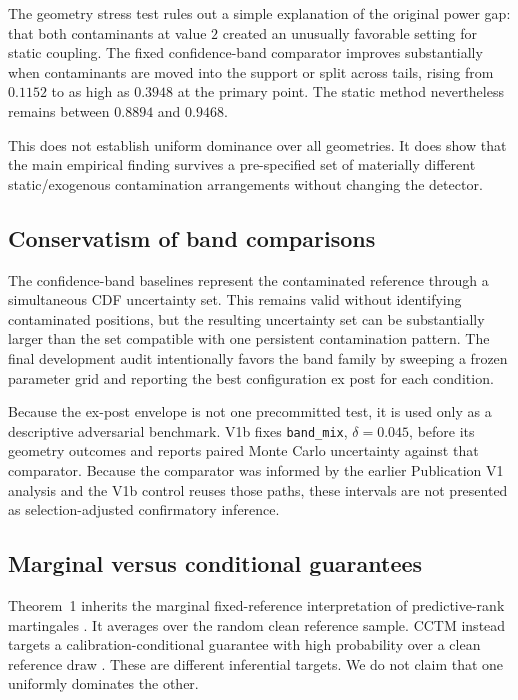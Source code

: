 The geometry stress test rules out a simple explanation of the original power gap: that both contaminants at value \(2\) created an unusually favorable setting for static coupling. The fixed confidence-band comparator improves substantially when contaminants are moved into the support or split across tails, rising from \(0.1152\) to as high as \(0.3948\) at the primary point. The static method nevertheless remains between \(0.8894\) and \(0.9468\).

This does not establish uniform dominance over all geometries. It does show that the main empirical finding survives a pre-specified set of materially different static/exogenous contamination arrangements without changing the detector.

\subsection{Conservatism of band comparisons}

The confidence-band baselines represent the contaminated reference through a simultaneous CDF uncertainty set. This remains valid without identifying contaminated positions, but the resulting uncertainty set can be substantially larger than the set compatible with one persistent contamination pattern. The final development audit intentionally favors the band family by sweeping a frozen parameter grid and reporting the best configuration ex post for each condition.

Because the ex-post envelope is not one precommitted test, it is used only as a descriptive adversarial benchmark. V1b fixes \texttt{band\_mix}, \(\delta=0.045\), before its geometry outcomes and reports paired Monte Carlo uncertainty against that comparator. Because the comparator was informed by the earlier Publication V1 analysis and the V1b control reuses those paths, these intervals are not presented as selection-adjusted confirmatory inference.

\subsection{Marginal versus conditional guarantees}

Theorem~1 inherits the marginal fixed-reference interpretation of predictive-rank martingales \cite{KuangXia2026}. It averages over the random clean reference sample. CCTM instead targets a calibration-conditional guarantee with high probability over a clean reference draw \cite{ShaerEtAl2026}. These are different inferential targets. We do not claim that one uniformly dominates the other.

